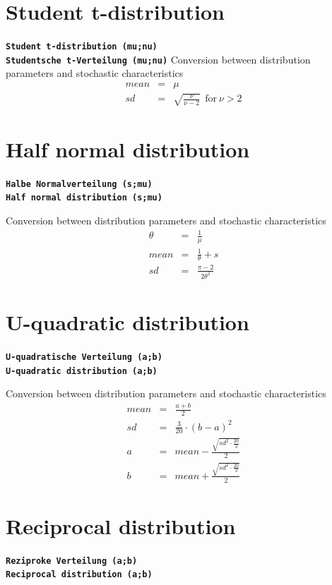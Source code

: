 \documentclass{svmono}
\def\cm#1{\textbf{\texttt{#1}}}
\begin{document}
\section*{Student t-distribution}
\cm{Student t-distribution (mu;nu)}~\\
\cm{Studentsche t-Verteilung (mu;nu)}
Conversion between distribution parameters and stochastic characteristics
\begin{eqnarray*}
mean&=&\mu\\
sd&=&\sqrt{\frac{\nu}{\nu-2}}~~\textrm{for}~\nu>2
\end{eqnarray*}





\section*{Half normal distribution}
\cm{Halbe Normalverteilung (s;mu)}~\\
\cm{Half normal distribution (s;mu)}

Conversion between distribution parameters and stochastic characteristics
\begin{eqnarray*}
\theta&=&\frac{1}{\mu}\\
mean&=&\frac{1}{\theta}+s\\
sd&=&\frac{\pi-2}{2\theta^2}
\end{eqnarray*}





\section*{U-quadratic distribution}
\cm{U-quadratische Verteilung (a;b)}~\\
\cm{U-quadratic distribution (a;b)}

Conversion between distribution parameters and stochastic characteristics
\begin{eqnarray*}
mean&=&\frac{a+b}{2}\\
sd&=&\frac{3}{20}\cdot(b-a)^2\\
a&=&mean-\frac{\sqrt{sd^2\cdot\frac{20}{3}}}{2}\\
b&=&mean+\frac{\sqrt{sd^2\cdot\frac{20}{3}}}{2}
\end{eqnarray*}





\section*{Reciprocal distribution}
\cm{Reziproke Verteilung (a;b)}~\\
\cm{Reciprocal distribution (a;b)}
\end{document}
